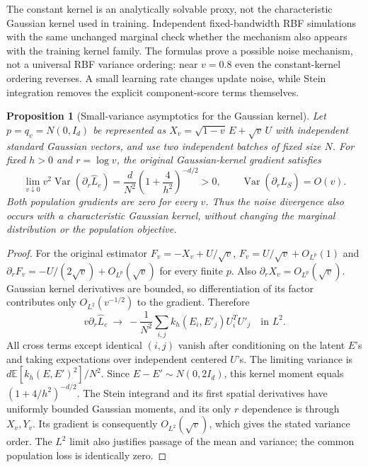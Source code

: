 \documentclass[11pt,a4paper]{article}
\newtheorem{proposition}{Proposition}[section]
\newcommand{\E}{\mathbb E}
\newcommand{\Var}{\operatorname{Var}}
\begin{document}
The constant kernel is an analytically solvable proxy, not the characteristic
Gaussian kernel used in training. Independent fixed-bandwidth RBF simulations
with the same unchanged marginal check whether the mechanism also appears
with the training kernel family. The formulas prove a possible noise mechanism,
not a universal RBF variance ordering: near $v=0.8$ even the constant-kernel
ordering reverses. A small learning rate changes update noise, while Stein
integration removes the explicit component-score terms themselves.

\begin{proposition}[Small-variance asymptotics for the Gaussian kernel]
Let $p=q_v=N(0,I_d)$ be represented as
$X_v=\sqrt{1-v}\,E+\sqrt v\,U$ with independent standard Gaussian vectors,
and use two independent batches of fixed size $N$. For fixed $h>0$ and
$r=\log v$, the original Gaussian-kernel gradient satisfies
\begin{equation}
 \lim_{v\downarrow0}v^2\Var(\partial_r\widehat L_c)
 =\frac{d}{N^2}\left(1+\frac4{h^2}\right)^{-d/2}>0,
 \qquad \Var(\partial_r\widehat L_S)=O(v).
 \label{eq:rbf-asymptotic}
\end{equation}
Both population gradients are zero for every $v$. Thus the noise divergence
also occurs with a characteristic Gaussian kernel, without changing the
marginal distribution or the population objective.
\end{proposition}
\begin{proof}
For the original estimator $F_v=-X_v+U/\sqrt v$,
$F_v=U/\sqrt v+O_{L^p}(1)$ and
$\partial_r F_v=-U/(2\sqrt v)+O_{L^p}(\sqrt v)$ for every finite $p$.
Also $\partial_rX_v=O_{L^p}(\sqrt v)$. Gaussian kernel derivatives are
bounded, so differentiation of its factor contributes only
$O_{L^2}(v^{-1/2})$ to the gradient. Therefore
\[
 v\partial_r\widehat L_c\ \longrightarrow\
 -\frac1{N^2}\sum_{i,j}k_h(E_i,E'_j)U_i^TU'_j
 \quad\text{in }L^2.
\]
All cross terms except identical $(i,j)$ vanish after conditioning on the
latent $E$'s and taking expectations over independent centered $U$'s.
The limiting variance is
$d\E[k_h(E,E')^2]/N^2$.
Since $E-E'\sim N(0,2I_d)$, this kernel moment equals
$(1+4/h^2)^{-d/2}$. The Stein integrand and its first spatial derivatives
have uniformly bounded Gaussian moments, and its only $r$ dependence is
through $X_v,Y_v$. Its gradient is consequently $O_{L^2}(\sqrt v)$,
which gives the stated variance order. The $L^2$ limit also justifies passage
of the mean and variance; the common population loss is identically zero.
\end{proof}
\end{document}
